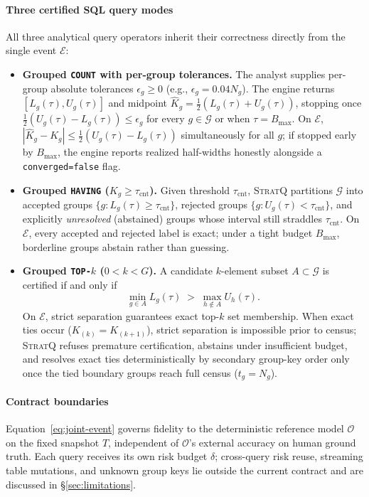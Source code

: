 \paragraph{Three certified SQL query modes}
All three analytical query operators inherit their correctness directly from the single event $\mathcal{E}$:
\begin{itemize}
  \item \textbf{Grouped \texttt{COUNT} with per-group tolerances.} The analyst supplies per-group absolute tolerances $\epsilon_g \ge 0$ (e.g., $\epsilon_g = 0.04 N_g$). The engine returns $[L_g(\tau), U_g(\tau)]$ and midpoint $\hat{K}_g = \tfrac{1}{2}(L_g(\tau)+U_g(\tau))$, stopping once $\tfrac{1}{2}(U_g(\tau)-L_g(\tau)) \le \epsilon_g$ for every $g \in \mathcal{G}$ or when $\tau = B_{\max}$. On $\mathcal{E}$, $|\hat{K}_g - K_g| \le \tfrac{1}{2}(U_g(\tau)-L_g(\tau))$ simultaneously for all $g$; if stopped early by $B_{\max}$, the engine reports realized half-widths honestly alongside a \texttt{converged=false} flag.
  \item \textbf{Grouped \texttt{HAVING} ($K_g \ge \tau_{\text{cnt}}$).} Given threshold $\tau_{\text{cnt}}$, \textsc{StratQ} partitions $\mathcal{G}$ into accepted groups $\{g : L_g(\tau) \ge \tau_{\text{cnt}}\}$, rejected groups $\{g : U_g(\tau) < \tau_{\text{cnt}}\}$, and explicitly \emph{unresolved} (abstained) groups whose interval still straddles $\tau_{\text{cnt}}$. On $\mathcal{E}$, every accepted and rejected label is exact; under a tight budget $B_{\max}$, borderline groups abstain rather than guessing.
  \item \textbf{Grouped \texttt{TOP-$k$} ($0 < k < G$).} A candidate $k$-element subset $A \subset \mathcal{G}$ is certified if and only if
  \begin{equation}
    \min_{g \in A} L_g(\tau) \;>\; \max_{h \notin A} U_h(\tau).
    \label{eq:topk-cert}
  \end{equation}
  On $\mathcal{E}$, strict separation guarantees exact top-$k$ set membership. When exact ties occur ($K_{(k)} = K_{(k+1)}$), strict separation is impossible prior to census; \textsc{StratQ} refuses premature certification, abstains under insufficient budget, and resolves exact ties deterministically by secondary group-key order only once the tied boundary groups reach full census ($t_g = N_g$).
\end{itemize}

\paragraph{Contract boundaries}
Equation~\eqref{eq:joint-event} governs fidelity to the deterministic reference model $\mathcal{O}$ on the fixed snapshot $T$, independent of $\mathcal{O}$'s external accuracy on human ground truth. Each query receives its own risk budget $\delta$; cross-query risk reuse, streaming table mutations, and unknown group keys lie outside the current contract and are discussed in \S\ref{sec:limitations}.
